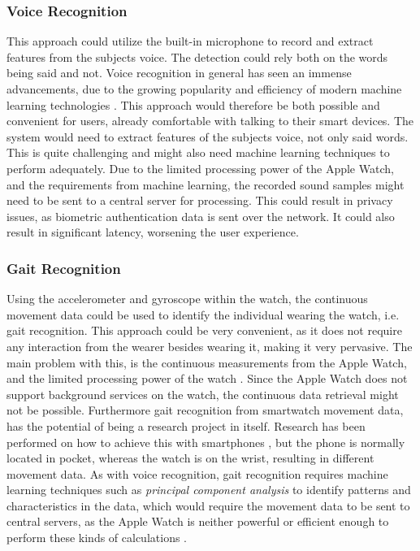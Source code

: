 \subsubsection{Voice Recognition}
This approach could utilize the built-in microphone to record and extract
features from the subjects voice. The detection could rely both on the words
being said and not. Voice recognition in general has seen an immense
advancements, due to the growing popularity and efficiency of modern machine 
learning technologies \cite{6296526}. 
This approach would therefore be both possible and convenient for users, already 
comfortable with talking to their smart devices. 
The system would need to extract features of the subjects voice, not only said
words. This is quite challenging and might also need machine learning techniques to
perform adequately. Due to the limited processing power of the Apple Watch, and
the requirements from machine learning, the recorded sound samples might need to
be sent to a central server for processing. This could result in privacy issues,
as biometric authentication data is sent over the network. It could also result
in significant latency, worsening the user experience. 

\subsubsection{Gait Recognition}
Using the accelerometer and gyroscope within the watch, the continuous movement
data could be used to identify the individual wearing the watch, i.e. gait
recognition. This approach could be very convenient, as it does not require any
interaction from the wearer besides wearing it, making it very pervasive.
The main problem with this, is the continuous measurements from the Apple Watch, and the
limited processing power of the watch \cite{ferrero2015a}. Since the Apple Watch
does not support background services on the watch, the continuous data retrieval
might not be possible. Furthermore gait recognition from smartwatch movement
data, has the potential of being a research project in itself. Research has been
performed on how to achieve this with smartphones \cite{ferrero2015a}, but the 
phone is normally located in pocket, whereas the watch is on the wrist, 
resulting in different movement data. As with voice recognition, gait
recognition requires machine learning techniques such as \textit{principal
    component analysis} to identify patterns and characteristics in the data,
    which would require the movement data to be sent to central servers, as the
    Apple Watch is neither powerful or efficient enough to perform these kinds
    of calculations \cite{dawson2008a}.

